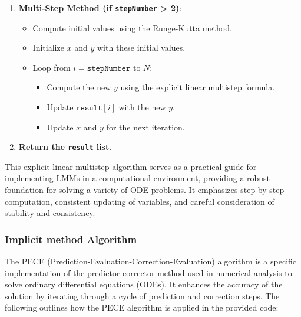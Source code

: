 \begin{enumerate}
        \item \textbf{Multi-Step Method (if \texttt{stepNumber} > 2)}:
        \begin{itemize}
            \item Compute initial values using the Runge-Kutta method.
            \item Initialize $x$ and $y$ with these initial values.
            \item Loop from $i = \texttt{stepNumber}$ to $N$:
            \begin{itemize}
                \item Compute the new $y$ using the explicit linear multistep formula.
                \item Update $\texttt{result}[i]$ with the new $y$.
                \item Update $x$ and $y$ for the next iteration.
            \end{itemize}
        \end{itemize}
        
        \item \textbf{Return the \texttt{result} list}.
    \end{enumerate}

This explicit linear multistep algorithm serves as a practical guide for implementing LMMs in a computational environment, providing a robust foundation for solving a variety of ODE problems. It emphasizes step-by-step computation, consistent updating of variables, and careful consideration of stability and consistency.

 \newpage


\subsubsection{Implicit method Algorithm}

The PECE (Prediction-Evaluation-Correction-Evaluation) algorithm is a specific implementation of the predictor-corrector method used in numerical analysis to solve ordinary differential equations (ODEs). It enhances the accuracy of the solution by iterating through a cycle of prediction and correction steps. The following outlines how the PECE algorithm is applied in the provided code:

